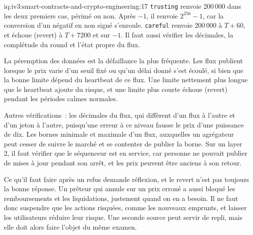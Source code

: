 \begin{solution}{iq:iv3:smart-contracts-and-crypto-engineering:17}
\texttt{trusting} renvoie 200\,000 dans les deux premiers cas, périmé ou non. Après $-1$, il renvoie $2^{256} - 1$, car la conversion d'un négatif en non signé s'enroule. \texttt{careful} renvoie 200\,000 à $T + 60$, et échoue (revert) à $T + 7200$ et sur $-1$. Il faut aussi vérifier les décimales, la complétude du round et l'état propre du flux.

La péremption des données est la défaillance la plus fréquente. Les flux publient lorsque le prix varie d'un seuil fixé ou qu'un délai donné s'est écoulé, si bien que la bonne limite dépend du heartbeat de ce flux. Une limite nettement plus longue que le heartbeat ajoute du risque, et une limite plus courte échoue (revert) pendant les périodes calmes normales.

Autres vérifications~: les décimales du flux, qui diffèrent d'un flux à l'autre et d'un jeton à l'autre, puisqu'une erreur à ce niveau fausse le prix d'une puissance de dix. Les bornes minimale et maximale d'un flux, auxquelles un agrégateur peut cesser de suivre le marché et se contenter de publier la borne. Sur un layer 2, il faut vérifier que le séquenceur est en service, car personne ne pouvait publier de mises à jour pendant son arrêt, et les prix peuvent être anciens à son retour.

Ce qu'il faut faire après un refus demande réflexion, et le revert n'est pas toujours la bonne réponse. Un prêteur qui annule sur un prix erroné a aussi bloqué les remboursements et les liquidations, justement quand on en a besoin. Il ne faut donc suspendre que les actions risquées, comme les nouveaux emprunts, et laisser les utilisateurs réduire leur risque. Une seconde source peut servir de repli, mais elle doit alors faire l'objet du même examen.

\end{solution}

